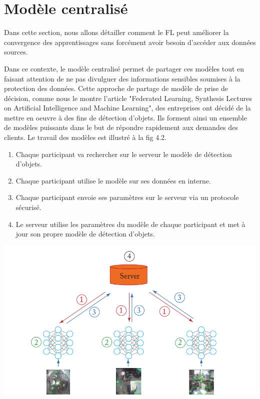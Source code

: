 \documentclass[12pt,a4paper,french]{report}
\begin{document}
\section{Modèle centralisé}

Dans cette section, nous allons détailler comment le FL peut améliorer la convergence des apprentissages sans forcément avoir besoin d'accéder aux données sources.

Dans ce contexte, le modèle centralisé permet de  partager ces modèles tout en faisant attention de ne pas divulguer des informations sensibles soumises à la protection des données. Cette approche de partage de modèle de prise de décision, comme nous le montre l'article "Federated Learning, Synthesis Lectures on Artificial Intelligence and Machine Learning", des entreprises ont décidé de la mettre en oeuvre à des fins de détection d'objets. Ils forment ainsi un ensemble de modèles puissants dans le but de répondre rapidement aux demandes des clients. Le travail des modèles est illustré à la fig 4.2.

\begin{enumerate}
\item Chaque participant va rechercher sur le serveur le modèle de détection d'objets.
\item Chaque participant utilise le modèle sur ses données en interne.
\item Chaque participant envoie ses paramètres sur le serveur via un protocole sécurisé.
\item Le serveur utilise les paramètres du modèle de chaque participant et met à jour son propre modèle de détection d'objets.
\end{enumerate}

\begin{center}
    \includegraphics[scale=0.4]{fl_model_partage}
    \label{fig1}
\end{center}
\end{document}
